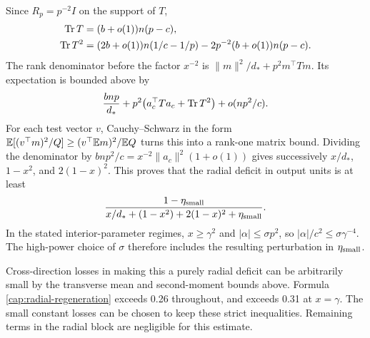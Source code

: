 Since $R_p=p^{-2}I$ on the support of $T$,
\begin{align}
 \operatorname{Tr} T&=(b+o(1))n(p-c),\nonumber\\
 \operatorname{Tr} T^2&=(2b+o(1))n(1/c-1/p)
             -2p^{-2}(b+o(1))n(p-c).\label{cap:trace-difference-square}
\end{align}
The rank denominator before the factor $x^{-2}$ is
$\|m\|^2/d_*+p^2m^\top Tm$. Its expectation is bounded above by
\begin{equation}
 \frac{bnp}{d_*}
 +p^2\bigl(a_c^\top T a_c+\operatorname{Tr} T^2\bigr)+o(n p^2/c).
 \label{cap:radial-denominator}
\end{equation}
For each test vector $v$, Cauchy--Schwarz in the form $\mathbb E[(v^\top
m)^2/Q]\ge(v^\top\mathbb E m)^2/\mathbb E Q$ turns this into a rank-one matrix bound.
Dividing the denominator by $bn p^2/c=x^{-2}\|a_c\|^2(1+o(1))$ gives
successively $x/d_*$, $1-x^2$, and $2(1-x)^2$. This proves
that the radial deficit in output units is at least
\begin{equation}\label{cap:radial-regeneration}
 \frac{1-\eta_{\rm small}}
      {x/d_*+(1-x^2)+2(1-x)^2+\eta_{\rm small}}.
\end{equation}
In the stated interior-parameter regimes, \(x\ge\gamma^2\) and
\(|\alpha|\le\sigma p^2\), so
\(|\alpha|/c^2\le\sigma\gamma^{-4}\). The high-power choice of
\(\sigma\) therefore includes the resulting perturbation in
\(\eta_{\rm small}\).

Cross-direction losses in making this a purely radial deficit can be
arbitrarily small by the transverse mean and second-moment bounds above.
Formula \eqref{cap:radial-regeneration} exceeds 0.26 throughout, and exceeds
0.31 at \(x=\gamma\). The small constant losses can be chosen to keep these
strict inequalities. Remaining terms in the radial block are negligible for
this estimate.

